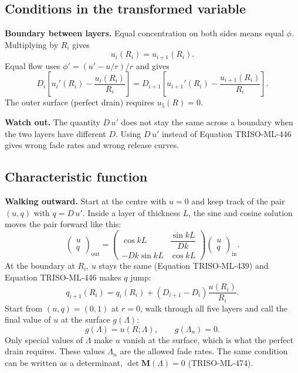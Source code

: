\documentclass[11pt]{article}
\begin{document}
\subsection{Conditions in the transformed variable}
\textbf{Boundary between layers.} Equal concentration on both sides means equal $\phi$. Multiplying by $R_i$ gives
\begin{equation}
u_i(R_i)=u_{i+1}(R_i).
\tag{TRISO-ML-439}
\end{equation}
Equal flow uses $\phi'=(u'-u/r)/r$ and gives
\begin{equation}
D_i\left[u_i'(R_i)-\frac{u_i(R_i)}{R_i}\right]=D_{i+1}\left[u_{i+1}'(R_i)-\frac{u_{i+1}(R_i)}{R_i}\right].
\tag{TRISO-ML-446}
\end{equation}
The outer surface (perfect drain) requires $u_5(R)=0$.

\textbf{Watch out.} The quantity $D\,u'$ does not stay the same across a boundary when the two layers have different $D$. Using $D\,u'$ instead of Equation TRISO-ML-446 gives wrong fade rates and wrong release curves.

\subsection{Characteristic function}
\textbf{Walking outward.} Start at the centre with $u=0$ and keep track of the pair $(u,q)$ with $q=D\,u'$. Inside a layer of thickness $L$, the sine and cosine solution moves the pair forward like this:
\begin{equation}
\begin{pmatrix}u\\ q\end{pmatrix}_{\mathrm{out}}=\begin{pmatrix}\cos kL & \dfrac{\sin kL}{Dk}\\[2mm] -Dk\sin kL & \cos kL\end{pmatrix}\begin{pmatrix}u\\ q\end{pmatrix}_{\mathrm{in}}.
\tag{TRISO-DEL-010}
\end{equation}
At the boundary at $R_i$, $u$ stays the same (Equation TRISO-ML-439) and Equation TRISO-ML-446 makes $q$ jump:
\begin{equation}
q_{i+1}(R_i)=q_i(R_i)+\left(D_{i+1}-D_i\right)\frac{u(R_i)}{R_i}.
\tag{TRISO-DEL-011}
\end{equation}
Start from $(u,q)=(0,1)$ at $r=0$, walk through all five layers and call the final value of $u$ at the surface $g(\Lambda)$:
\begin{equation}
g(\Lambda)=u(R;\Lambda),\qquad g(\Lambda_n)=0.
\tag{TRISO-DEL-012}
\end{equation}
Only special values of $\Lambda$ make $u$ vanish at the surface, which is what the perfect drain requires. These values $\Lambda_n$ are the allowed fade rates. The same condition can be written as a determinant, $\det\mathbf M(\Lambda)=0$ (TRISO-ML-474).
\end{document}
